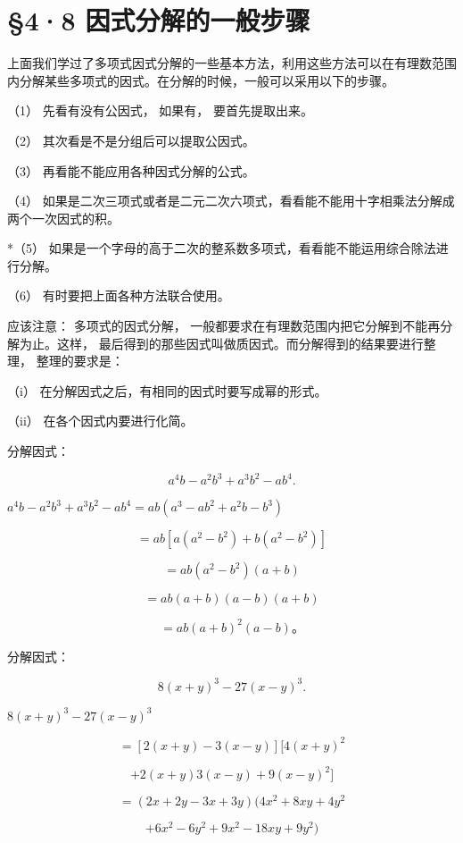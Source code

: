 \section{§4·8 因式分解的一般步骤}

上面我们学过了多项式因式分解的一些基本方法，利用这些方法可以在有理数范围内分解某些多项式的因式。在分解的时候，一般可以采用以下的步骤。

（1） 先看有没有公因式， 如果有， 要首先提取出来。

（2） 其次看是不是分组后可以提取公因式。

（3） 再看能不能应用各种因式分解的公式。

（4）
如果是二次三项式或者是二元二次六项式，看看能不能用十字相乘法分解成两个一次因式的积。

*（5）
如果是一个字母的高于二次的整系数多项式，看看能不能运用综合除法进行分解。

（6） 有时要把上面各种方法联合使用。

应该注意： 多项式的因式分解，
一般都要求在有理数范围内把它分解到不能再分解为止。这样，
最后得到的那些因式叫做质因式。而分解得到的结果要进行整理，
整理的要求是：

（i） 在分解因式之后，有相同的因式时要写成幂的形式。

（ii） 在各个因式内要进行化简。

 分解因式：

\[
a ^{4} b - a ^{2} b ^{3} + a ^{3} b ^{2} - a b ^{4}.
\]

\(a^4 b - a^2 b^3 + a^3 b^2 - ab^4 = a b(a^3 - ab^2 + a^2 b - b^3)\)

\[
= a b \left[ a \left(a ^{2} - b ^{2}\right) + b \left(a ^{2} - b ^{2}\right) \right]
\]

\[
= a b \left(a ^{2} - b ^{2}\right) (a + b)
\]

\[
= a b (a + b) (a - b) (a + b)
\]

\[
= a b (a + b) ^{2} (a - b)\text{。}
\]

 分解因式：

\[
8 (x + y) ^{3} - 27 (x - y) ^{3}.
\]

\(8(x + y)^{3} - 27(x - y)^{3}\)

\[
= [ 2 (x + y) - 3 (x - y) ] [ 4 (x + y) ^{2}
\]

\[
+ 2 (x + y) 3 (x - y) + 9 (x - y) ^{2} ]
\]

\[
= (2 x + 2 y - 3 x + 3 y) (4 x ^{2} + 8 x y + 4 y ^{2}
\]

\[
+ 6 x ^{2} - 6 y ^{2} + 9 x ^{2} - 18 x y + 9 y ^{2})
\]

